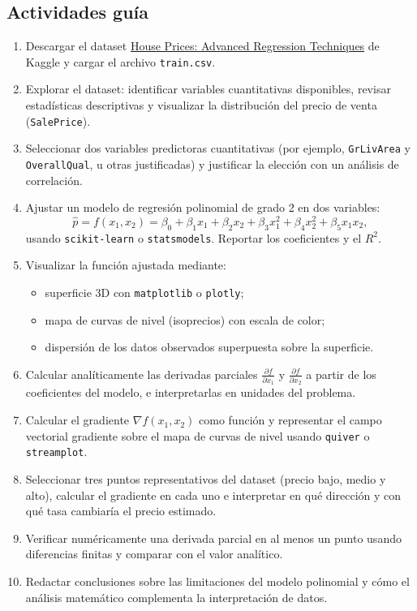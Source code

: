 \documentclass[a4,11pt]{aleph-notas}
\begin{document}
\subsection*{Actividades guía}
\begin{enumerate}[leftmargin=*, label={{\arabic*.}}]
    \item Descargar el dataset \href{https://www.kaggle.com/competitions/house-prices-advanced-regression-techniques/data}{House Prices: Advanced Regression Techniques} de Kaggle y cargar el archivo \texttt{train.csv}.
    \item Explorar el dataset: identificar variables cuantitativas disponibles, revisar estadísticas descriptivas y visualizar la distribución del precio de venta (\texttt{SalePrice}).
    \item Seleccionar dos variables predictoras cuantitativas (por ejemplo, \texttt{GrLivArea} y \texttt{OverallQual}, u otras justificadas) y justificar la elección con un análisis de correlación.
    \item Ajustar un modelo de regresión polinomial de grado 2 en dos variables:
    \[
        \hat{p} = f(x_1, x_2) = \beta_0 + \beta_1 x_1 + \beta_2 x_2 + \beta_3 x_1^2 + \beta_4 x_2^2 + \beta_5 x_1 x_2,
    \]
    usando \texttt{scikit-learn} o \texttt{statsmodels}. Reportar los coeficientes y el $R^2$.
    \item Visualizar la función ajustada mediante:
    \begin{itemize}
        \item superficie 3D con \texttt{matplotlib} o \texttt{plotly};
        \item mapa de curvas de nivel (isoprecios) con escala de color;
        \item dispersión de los datos observados superpuesta sobre la superficie.
    \end{itemize}
    \item Calcular analíticamente las derivadas parciales $\frac{\partial f}{\partial x_1}$ y $\frac{\partial f}{\partial x_2}$ a partir de los coeficientes del modelo, e interpretarlas en unidades del problema.
    \item Calcular el gradiente $\nabla f(x_1, x_2)$ como función y representar el campo vectorial gradiente sobre el mapa de curvas de nivel usando \texttt{quiver} o \texttt{streamplot}.
    \item Seleccionar tres puntos representativos del dataset (precio bajo, medio y alto), calcular el gradiente en cada uno e interpretar en qué dirección y con qué tasa cambiaría el precio estimado.
    \item Verificar numéricamente una derivada parcial en al menos un punto usando diferencias finitas y comparar con el valor analítico.
    \item Redactar conclusiones sobre las limitaciones del modelo polinomial y cómo el análisis matemático complementa la interpretación de datos.
\end{enumerate}
\end{document}
